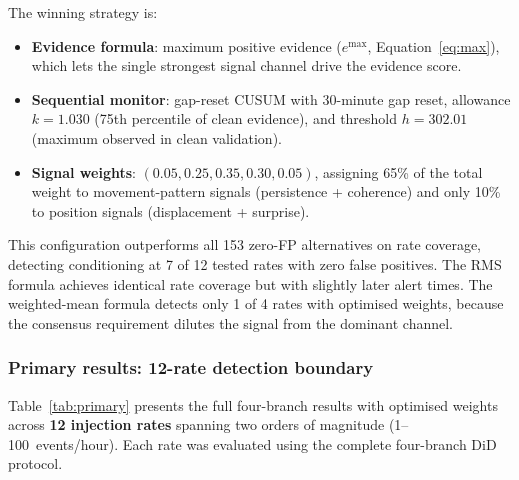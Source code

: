\documentclass[10pt,twocolumn]{article}
\begin{document}
The winning strategy is:
\begin{itemize}
  \item \textbf{Evidence formula}: maximum positive evidence
    ($e^{\mathrm{max}}$, Equation~\ref{eq:max}), which lets the single
    strongest signal channel drive the evidence score.
  \item \textbf{Sequential monitor}: gap-reset CUSUM with 30-minute gap
    reset, allowance $k=1.030$ (75th percentile of clean evidence),
    and threshold $h=302.01$ (maximum observed in clean validation).
  \item \textbf{Signal weights}: $(0.05,0.25,0.35,0.30,0.05)$, assigning
    65\% of the total weight to movement-pattern signals (persistence +
    coherence) and only 10\% to position signals (displacement + surprise).
\end{itemize}

This configuration outperforms all 153 zero-FP alternatives on rate
coverage, detecting conditioning at 7 of 12 tested rates with zero false
positives.
The RMS formula achieves identical rate coverage but with slightly later
alert times.  The weighted-mean formula detects only 1 of 4 rates with
optimised weights, because the consensus requirement dilutes the signal
from the dominant channel.

\subsubsection{Primary results: 12-rate detection boundary}

Table~\ref{tab:primary} presents the full four-branch results with
optimised weights across \textbf{12 injection rates} spanning two orders
of magnitude (1--100~events/hour).  Each rate was evaluated using the
complete four-branch DiD protocol.
\end{document}
